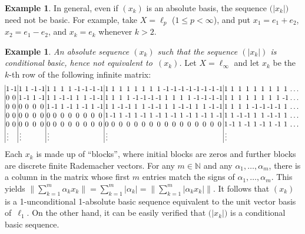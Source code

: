 \documentclass[12pt]{amsart}
\theoremstyle{plain}
\theoremstyle{definition}
\newtheorem{example}[theorem]{Example}
\newcommand{\abs}[1]{\lvert#1\rvert}
\newcommand{\bignorm}[1]{\bigl\lVert#1\bigr\rVert}
\renewcommand{\le}{\leqslant}
\begin{document}
\begin{example}
  In general, even if $(x_k)$ is an absolute basis, the sequence
  $\bigl(\abs{x_k}\bigr)$ need not be basic. For example, take
  $X=\ell_p$ ($1\le p<\infty$), and put $x_1=e_1+e_2$, $x_2=e_1-e_2$,
  and $x_k=e_k$ whenever $k>2$.
\end{example}

\begin{example}
  \emph{An absolute sequence $(x_k)$ such that the sequence
    $(\abs{x_k})$ is conditional basic, hence not equivalent
    to~$(x_k)$.} Let $X=\ell_\infty$ and let $x_k$ be the $k$-th row
  of the following infinite matrix: {\small
  \begin{displaymath}
  \renewcommand{\tabcolsep}{1pt}
    \begin{tabular}{|cc|cccc|cccccccc|cccccccccccccccc|cccccccccc}
    1&-1&1&1&-1&-1&1&1&1&1&-1&-1&-1&-1&
     1&1&1&1&1&1&1&1&-1&-1&-1&-1&-1&-1&-1&-1&1&1&1&1&1&1&1&1&1&\dots\\
    0&0&1&-1&1&-1&1&1&-1&-1&1&1&-1&-1&
      1&1&1&1&-1&-1&-1&-1&1&1&1&1&-1&-1&-1&-1&1&1&1&1&1&1&1&1&-1&\dots\\
    0&0&0&0&0&0&1&-1&1&-1&1&-1&1&-1&
      1&1&-1&-1&1&1&-1&-1&1&1&-1&-1&1&1&-1&-1&1&1&1&1&-1&-1&-1&-1&1&\dots\\
    0&0&0&0&0&0&0&0&0&0&0&0&0&0&
      1&-1&1&-1&1&-1&1&-1&1&-1&1&-1&1&-1&1&-1&1&1&-1&-1&1&1&-1&-1&1&\dots\\
    0&0&0&0&0&0&0&0&0&0&0&0&0&0&
      0&0&0&0&0&0&0&0&0&0&0&0&0&0&0&0&1&-1&1&-1&1&-1&1&-1&1&\dots\\
      \vdots&&\vdots&&&&\vdots&&&&&&&&\vdots&&&&&&&&&&&&&&&&\vdots&&&&&&
    \end{tabular}
  \end{displaymath}
  }%
  Each $x_k$ is made up of ``blocks'', where initial blocks are zeros
  and further blocks are discrete finite Rademacher vectors. For any
  $m\in\mathbb N$ and any $\alpha_1,\dots,\alpha_m$, there is a column
  in the matrix whose first $m$ entries match the signs of
  $\alpha_1,\dots,\alpha_m$. This yields
  \begin{math}
    \bignorm{\sum_{k=1}^m\alpha_kx_k}=\sum_{k=1}^m\abs{\alpha_k}
    =\bignorm{\sum_{k=1}^m\abs{\alpha_kx_k}}.
  \end{math}
  It follows that $(x_k)$ is a 1-unconditional 1-absolute basic
  sequence equivalent to the unit vector basis of~$\ell_1$.  On the
  other hand, it can be easily verified that $\bigl(\abs{x_k}\bigr)$
  is a conditional basic sequence.
\end{example}
\end{document}

